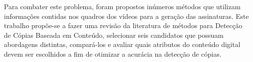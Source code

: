 Para combater este problema, foram propostos inúmeros métodos que utilizam informações contidas nos quadros dos vídeos para a geração das assinaturas. Este trabalho propõe-se a fazer uma revisão da literatura de métodos para Detecção de Cópias Baseada em Conteúdo, selecionar seis candidatos que possuam abordagens distintas, compará-los e avaliar quais atributos do conteúdo digital devem ser escolhidos a fim de otimizar a acurácia na detecção de cópias. 

